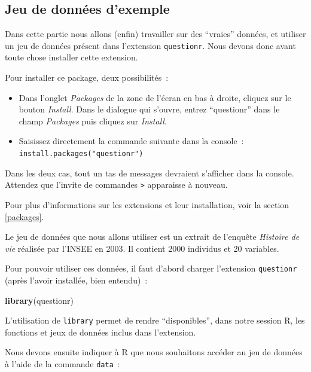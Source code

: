 \documentclass[12pt,]{book}
\newenvironment{Shaded}{\begin{snugshade}}{\end{snugshade}}
\newcommand{\KeywordTok}[1]{\textcolor[rgb]{0.27,0.27,0.27}{\textbf{#1}}}
\newcommand{\NormalTok}[1]{#1}
\providecommand{\tightlist}{%
  \setlength{\itemsep}{0pt}\setlength{\parskip}{0pt}}
\begin{document}
\hypertarget{jeu-de-donnuxe9es-dexemple}{%
\subsection{Jeu de données d'exemple}\label{jeu-de-donnuxe9es-dexemple}}

Dans cette partie nous allons (enfin) travailler sur des ``vraies'' données, et utiliser un jeu de données présent dans l'extension \texttt{questionr}. Nous devons donc avant toute chose installer cette extension.

Pour installer ce package, deux possibilités~:

\begin{itemize}
\tightlist
\item
  Dans l'onglet \emph{Packages} de la zone de l'écran en bas à droite, cliquez sur le bouton \emph{Install}. Dans le dialogue qui s'ouvre, entrez ``questionr'' dans le champ \emph{Packages} puis cliquez sur \emph{Install}.
\item
  Saisissez directement la commande suivante dans la console~: \texttt{install.packages("questionr")}
\end{itemize}

Dans les deux cas, tout un tas de messages devraient s'afficher dans la console. Attendez que l'invite de commandes \texttt{\textgreater{}} apparaisse à nouveau.

Pour plus d'informations sur les extensions et leur installation, voir la section \ref{packages}.

Le jeu de données que nous allons utiliser est un extrait de l'enquête \emph{Histoire de vie} réalisée par l'INSEE en 2003. Il contient 2000 individus et 20 variables.

Pour pouvoir utiliser ces données, il faut d'abord charger l'extension \texttt{questionr} (après l'avoir installée, bien entendu)~:

\begin{Shaded}
\begin{Highlighting}[]
\KeywordTok{library}\NormalTok{(questionr)}
\end{Highlighting}
\end{Shaded}

L'utilisation de \texttt{library} permet de rendre ``disponibles'', dans notre session R, les fonctions et jeux de données inclus dans l'extension.

Nous devons ensuite indiquer à R que nous souhaitons accéder au jeu de données à l'aide de la commande \texttt{data}~:
\end{document}
